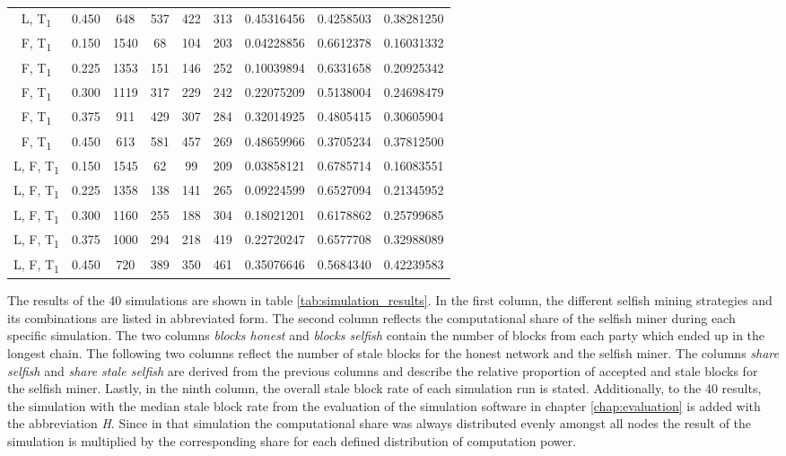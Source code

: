 {\begin{landscape}
\begin{tabular}{ccccccccc}
            L, T\textsubscript{1} & 0.450 & 648 & 537 & 422 & 313 & 0.45316456 & 0.4258503 & 0.38281250 \\
            F, T\textsubscript{1} & 0.150 & 1540 & 68 & 104 & 203 & 0.04228856 & 0.6612378 & 0.16031332 \\
            F, T\textsubscript{1} & 0.225 & 1353 & 151 & 146 & 252 & 0.10039894 & 0.6331658 & 0.20925342 \\
            F, T\textsubscript{1} & 0.300 & 1119 & 317 & 229 & 242 & 0.22075209 & 0.5138004 & 0.24698479 \\
            F, T\textsubscript{1} & 0.375 & 911 & 429 & 307 & 284 & 0.32014925 & 0.4805415 & 0.30605904 \\
            F, T\textsubscript{1} & 0.450 & 613 & 581 & 457 & 269 & 0.48659966 & 0.3705234 & 0.37812500 \\
            L, F, T\textsubscript{1} & 0.150 & 1545 & 62 & 99 & 209 & 0.03858121 & 0.6785714 & 0.16083551 \\
            L, F, T\textsubscript{1} & 0.225 & 1358 & 138 & 141 & 265 & 0.09224599 & 0.6527094 & 0.21345952 \\
            L, F, T\textsubscript{1} & 0.300 & 1160 & 255 & 188 & 304 & 0.18021201 & 0.6178862 & 0.25799685 \\
            L, F, T\textsubscript{1} & 0.375 & 1000 & 294 & 218 & 419 & 0.22720247 & 0.6577708 & 0.32988089 \\
            L, F, T\textsubscript{1} & 0.450 & 720 & 389 & 350 & 461 & 0.35076646 & 0.5684340 & 0.42239583 \\
    		\bottomrule
  		\end{tabular}
  		\label{tab:simulation_results}
	\end{landscape}
}

The results of the 40 simulations are shown in table \ref{tab:simulation_results}.
In the first column, the different selfish mining strategies and its combinations are listed in abbreviated form.
The second column reflects the  computational share of the selfish miner during each specific simulation.
The two columns \textit{blocks honest} and \textit{blocks selfish} contain the number of blocks from each party which ended up in the longest chain.
The following two columns reflect the number of stale blocks for the honest network and the selfish miner.
The columns \textit{share selfish} and \textit{share stale selfish} are derived from the previous columns and describe the relative proportion of accepted and stale blocks for the selfish miner.
Lastly, in the ninth column, the overall stale block rate of each simulation run is stated.
Additionally, to the 40 results, the simulation with the median stale block rate from the evaluation of the simulation software in chapter \ref{chap:evaluation} is added with the abbreviation \textit{H}.
Since in that simulation the computational share was always distributed evenly amongst all nodes the result of the simulation is multiplied by the corresponding share for each defined distribution of computation power.

